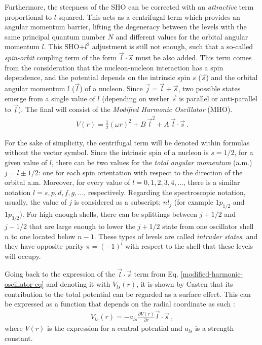Furthermore, the steepness of the SHO can be corrected with an \emph{attractive} term proportional to $l$-squared. This acts as a centrifugal term which provides an angular momentum barrier, lifting the degeneracy between the levels with the same principal quantum number $N$ and different values for the orbital angular momentum $l$. This SHO+$l^2$ adjustment is still not enough, such that a so-called \emph{spin-orbit} coupling term of the form $\vec{l}\cdot\vec{s}$ must be also added. This term comes from the consideration that the nucleon-nucleon interaction has a spin dependence, and the potential depends on the intrinsic spin $s$ ($\vec{s}$) and the orbital angular momentum $l$ ($\vec{l}$) of a nucleon. Since $\vec{j}=\vec{l}+\vec{s}$, two possible states emerge from a single value of $l$ (depending on wether $\vec{s}$ is parallel or anti-parallel to $\vec{l}$). The final will consist of the \emph{Modified Harmonic Oscillator} (MHO).
\begin{align}
    V(r)=\frac{1}{2}(\omega r)^2+B\ \vec{l}^2+A\ \vec{l}\cdot\vec{s}\ .
    \label{modified-harmonic-oscillator-eq}
\end{align}

For the sake of simplicity, the centrifugal term will be denoted within formulas without the vector symbol. Since the intrinsic spin of a nucleon is $s=1/2$, for a given value of $l$, there can be two values for the \emph{total angular momentum} (a.m.) $j=l\pm1/2$: one for each spin orientation with respect to the direction of the orbital a.m. Moreover, for every value of $l=0,1,2,3,4,\dots$, there is a similar notation $l=s,p,d,f,g,\dots$, respectively. Regarding the spectroscopic notation, usually, the value of $j$ is considered as a subscript; $nl_j$ (for example $1p_{1/2}$ and $1p_{3/2}$). For high enough shells, there can be splittings between $j+1/2$ and $j-1/2$ that are large enough to lower the $j+1/2$ state from one oscillator shell $n$ to one located below $n-1$. These types of levels are called \emph{intruder states}, and they have opposite parity $\pi=(-1)^l$ with respect to the shell that these levels will occupy.

Going back to the expression of the $\vec{l}\cdot\vec{s}$ term from Eq. \ref{modified-harmonic-oscillator-eq} and denoting it with $V_{ls}(r)$, it is shown by Casten \cite{casten2000nuclear} that its contribution to the total potential can be regarded as a surface effect.  This can be expressed as a function that depends on the radial coordinate as such \cite{casten2000nuclear}:
\begin{align}
    V_{ls}(r)=-a_{ls}\frac{\partial V(r)}{\partial r}\vec{l}\cdot\vec{s}\ ,
\end{align}
where $V(r)$ is the expression for a central potential and $a_{ls}$ is a strength constant.

